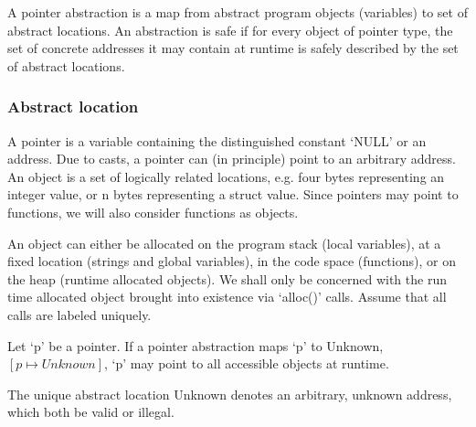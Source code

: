 

A pointer abstraction is a map from abstract program objects (variables) to set
of abstract locations. An abstraction is safe if for every object of pointer
type, the set of concrete addresses it may contain at runtime is safely
described by the set of abstract locations.

\subsubsection{Abstract location}

A pointer is a variable containing the distinguished constant `NULL' or an
address. Due to casts, a pointer can (in principle) point to an arbitrary
address. An object is a set of logically related locations, e.g. four bytes
representing an integer value, or n bytes representing a struct value. Since
pointers may point to functions, we will also consider functions as objects.

An object can either be allocated on the program stack (local variables), at a
fixed location (strings and global variables), in the code space (functions), or
on the heap (runtime allocated objects). We shall only be concerned with the run
time allocated object brought into existence via `alloc()' calls. Assume that
all calls are labeled uniquely.

\begin{Definition}
  Let `p' be a pointer. If a pointer abstraction maps `p' to Unknown,
  $[p \mapsto Unknown]$, `p' may point to all accessible objects at runtime.
\end{Definition}

The unique abstract location Unknown denotes an arbitrary, unknown address,
which both be valid or illegal.

